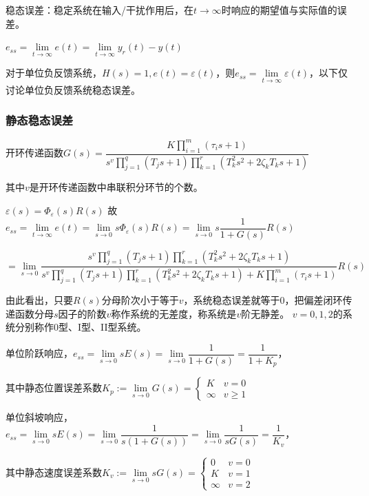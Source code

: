 \documentclass[11pt,a4paper]{ctexart}
\begin{document}
        稳态误差：稳定系统在输入/干扰作用后，在$t\rightarrow\infty$时响应的期望值与实际值的误差。
        
        $e_{ss}=\lim\limits_{t\rightarrow\infty}e(t)=\lim\limits_{t\rightarrow\infty}y_r(t)-y(t)$

        对于单位负反馈系统，$H(s)=1,e(t)=\varepsilon(t)$，则$e_{ss}=\lim\limits_{t\rightarrow\infty}\varepsilon(t)$，以下仅讨论单位负反馈系统稳态误差。
        \subsubsection{静态稳态误差}
            开环传递函数$G(s)=\dfrac{K\prod\limits_{i=1}^m(\tau_is+1)}{s^v\prod\limits_{j=1}^q(T_js+1)\prod\limits_{k=1}^r(T_k^2s^2+2\zeta_kT_ks+1)}$

            其中$v$是开环传递函数中串联积分环节的个数。
        
            $\varepsilon(s)=\varPhi_\varepsilon(s)R(s)$
            故$e_{ss}=\lim\limits_{t\rightarrow\infty}e(t)=\lim\limits_{s\rightarrow0}s\varPhi_\varepsilon(s)R(s)=\lim\limits_{s\rightarrow0}s\dfrac{1}{1+G(s)}R(s)$
        
            $=\lim\limits_{s\rightarrow0}\dfrac{s^v\prod\limits_{j=1}^q(T_js+1)\prod\limits_{k=1}^r(T_k^2s^2+2\zeta_kT_ks+1)}
            {s^v\prod\limits_{j=1}^q(T_js+1)\prod\limits_{k=1}^r(T_k^2s^2+2\zeta_kT_ks+1)+K\prod\limits_{i=1}^m(\tau_is+1)}R(s)$

            由此看出，只要$R(s)$分母阶次小于等于$v$，系统稳态误差就等于$0$，把偏差闭环传递函数分母$s$因子的阶数$v$称作系统的无差度，称系统是$v$阶无静差。
            $v=0,1,2$的系统分别称作0型、I型、II型系统。

            单位阶跃响应，$e_{ss}=\lim\limits_{s\rightarrow0}sE(s)=\lim\limits_{s\rightarrow0}\dfrac{1}{1+G(s)}=\dfrac{1}{1+K_p}$，
            
            其中静态位置误差系数$K_p:=\lim\limits_{s\rightarrow0}G(s)=\begin{cases}K&v=0\\\infty&v\geqslant1\end{cases}$

            单位斜坡响应，$e_{ss}=\lim\limits_{s\rightarrow0}sE(s)=\lim\limits_{s\rightarrow0}\dfrac{1}{s(1+G(s))}=\lim\limits_{s\rightarrow0}\dfrac{1}{sG(s)}=\dfrac{1}{K_v}$，
            
            其中静态速度误差系数$K_v:=\lim\limits_{s\rightarrow0}sG(s)=\begin{cases}0&v=0\\K&v=1\\\infty&v=2\end{cases}$
\end{document}
